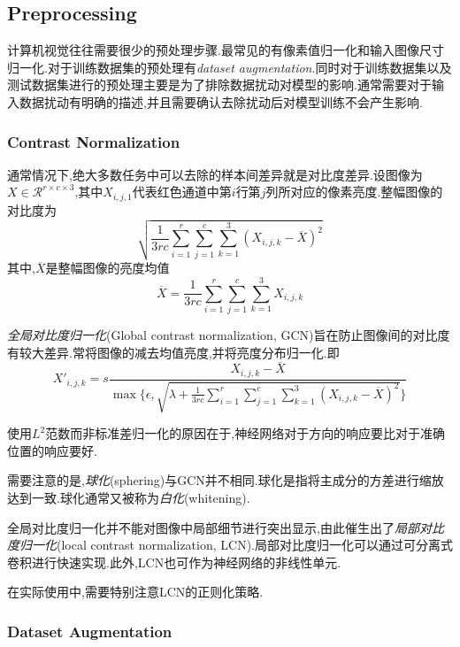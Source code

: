 \subsection{Preprocessing}

计算机视觉往往需要很少的预处理步骤.最常见的有像素值归一化和输入图像尺寸归一化.对于训练数据集的预处理有\textit{dataset augmentation}.同时对于训练数据集以及测试数据集进行的预处理主要是为了排除数据扰动对模型的影响.通常需要对于输入数据扰动有明确的描述,并且需要确认去除扰动后对模型训练不会产生影响.

\subsubsection{Contrast Normalization}

通常情况下,绝大多数任务中可以去除的样本间差异就是对比度差异.设图像为$X\in\mathcal R^{r\times c\times 3}$,其中$X_{i,j,1}$代表红色通道中第$i$行第$j$列所对应的像素亮度.整幅图像的对比度为
\begin{equation}
\sqrt{\frac{1}{3rc}\sum_{i=1}^{r}\sum_{j=1}^{c}\sum_{k=1}^{3}(X_{i,j,k}-\overline{X})^2}
\end{equation}
其中,$\overline X$是整幅图像的亮度均值
\begin{equation}
\overline X=\frac{1}{3rc}\sum_{i=1}^{r}\sum_{j=1}^{c}\sum_{k=1}^{3}X_{i,j,k}
\end{equation}

\textit{全局对比度归一化}(Global contrast normalization, GCN)旨在防止图像间的对比度有较大差异.常将图像的减去均值亮度,并将亮度分布归一化.即
\begin{equation}
X'_{i,j,k}=s\frac{X_{i,j,k}-\overline X}{\max\Big\{\epsilon,\sqrt{\lambda+\frac{1}{3rc}\sum_{i=1}^{r}\sum_{j=1}^{c}\sum_{k=1}^{3}(X_{i,j,k}-\overline X)^2}\Big\}}
\end{equation}

使用$L^2$范数而非标准差归一化的原因在于,神经网络对于方向的响应要比对于准确位置的响应要好.

需要注意的是,\textit{球化}(sphering)与GCN并不相同.球化是指将主成分的方差进行缩放达到一致.球化通常又被称为\textit{白化}(whitening).

全局对比度归一化并不能对图像中局部细节进行突出显示,由此催生出了\textit{局部对比度归一化}(local contrast normalization, LCN).局部对比度归一化可以通过可分离式卷积进行快速实现.此外,LCN也可作为神经网络的非线性单元.

在实际使用中,需要特别注意LCN的正则化策略.

\subsubsection{Dataset Augmentation}

